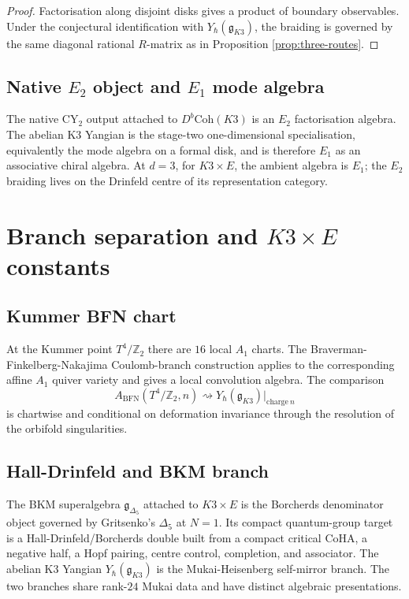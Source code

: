 \documentclass[11pt]{article}
\theoremstyle{definition}
\newcommand{\Z}{\mathbb{Z}}
\renewcommand{\gg}{\mathfrak{g}}
\newcommand{\YgK}{Y_\hbar(\gg_{K3})}
\newcommand{\Coh}{\mathrm{Coh}}
\begin{document}
\begin{proof}
Factorisation along disjoint disks gives a product of boundary
observables. Under the conjectural identification with $\YgK$, the
braiding is governed by the same diagonal rational $R$-matrix as in
Proposition \ref{prop:three-routes}.
\end{proof}

\subsection{Native $E_2$ object and $E_1$ mode algebra}

The native CY$_2$ output attached to $D^b\Coh(K3)$ is an $E_2$
factorisation algebra. The abelian K3 Yangian is the stage-two
one-dimensional specialisation, equivalently the mode algebra on a
formal disk, and is therefore $E_1$ as an associative chiral algebra. At
$d=3$, for $K3\times E$, the ambient algebra is $E_1$; the $E_2$ braiding
lives on the Drinfeld centre of its representation category.

\section{Branch separation and $K3\times E$ constants}
\label{sec:branch-separation}

\subsection{Kummer BFN chart}

At the Kummer point $T^4/\Z_2$ there are $16$ local $A_1$ charts. The
Braverman-Finkelberg-Nakajima Coulomb-branch construction applies to the
corresponding affine $A_1$ quiver variety and gives a local convolution
algebra. The comparison
\[
  A_{\mathrm{BFN}}(T^4/\Z_2,n)
  \rightsquigarrow
  \YgK|_{\mathrm{charge}\ n}
\]
is chartwise and conditional on deformation invariance through the
resolution of the orbifold singularities.

\subsection{Hall-Drinfeld and BKM branch}

The BKM superalgebra $\gg_{\Delta_5}$ attached to $K3\times E$ is the
Borcherds denominator object governed by Gritsenko's $\Delta_5$ at
$N=1$. Its compact quantum-group target is a Hall-Drinfeld/Borcherds
double built from a compact critical CoHA, a negative half, a Hopf
pairing, centre control, completion, and associator. The abelian K3
Yangian $\YgK$ is the Mukai-Heisenberg self-mirror branch. The two
branches share rank-$24$ Mukai data and have distinct algebraic
presentations.
\end{document}

